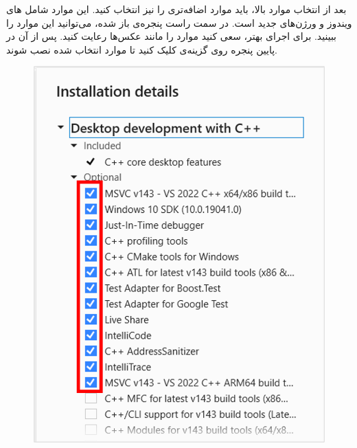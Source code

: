 {\begin{spacing}{1.5}
        بعد از انتخاب موارد بالا، باید موارد اضافه‌تری را نیز انتخاب کنید. این موارد شامل ‌های ویندوز و ورژن‌های جدید  است.
        در سمت راست پنجره‌ی باز شده، می‌توانید این موارد را ببینید. برای اجرای بهتر، سعی کنید موارد را مانند عکس‌ها رعایت کنید. پس از آن در پایین پنجره روی گزینه‌ی  کلیک کنید تا موارد انتخاب شده نصب شوند.
        \begin{figure}[H]
            \centering
            \setlength{\belowcaptionskip}{-10pt}
            \includegraphics[scale=0.7]{Images/3/3.Intro.3.1} \hspace{5mm}

\end{figure}
\end{spacing}}

